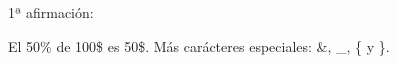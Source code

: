 \documentclass{article}
\begin{document}
1ª afirmación:

El 50\% de 100\$ es 50\$.
Más carácteres especiales: \&, \_, \{ y \}.
\end{document}
